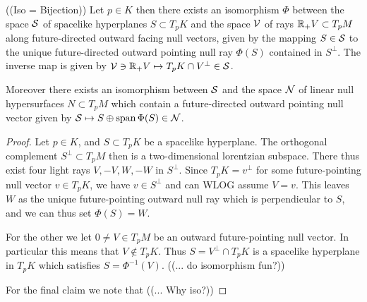 \begin{lemma}\label{lem:dirreconstr}
    ((Iso = Bijection))
Let $p\in K$ then there exists an isomorphism $\Phi$ between the space $\mathcal{S}$ of spacelike hyperplanes $S\subset T_pK$ and the space $\mathcal{V}$ of rays $\mathbb{R}_+V\subset T_pM$ along future-directed outward facing null vectors, given by the mapping $S\in \mathcal{S}$ to the unique future-directed outward pointing null ray $\Phi(S)$ contained in $S^\perp$. The inverse map is given by $\mathcal{V}\ni \mathbb{R}_+V \mapsto T_pK \cap V^\perp\in \mathcal{S}$.

Moreover there exists an isomorphism between $\mathcal{S}$ and the space $\mathcal{N}$ of linear null hypersurfaces $N\subset T_pM$ which contain a future-directed outward pointing null vector given by $\mathcal{S}\mapsto S\oplus \operatorname{span} \Phi(S)\in \mathcal{N}$.
\end{lemma}
\begin{proof}
    Let $p\in K$, and $S\subset T_pK$ be a spacelike hyperplane. The orthogonal complement $S^\perp\subset T_pM$ then is a two-dimensional lorentzian subspace. There thus exist four light rays $V,-V,W,-W$ in $S^\perp$. Since $T_pK=v^\perp$ for some future-pointing null vector $v\in T_pK$, we have $v\in S^\perp$ and can WLOG assume $V=v$. This leaves $W$ as the unique future-pointing outward null ray which is perpendicular to $S$, and we can thus set $\Phi(S)=W$.

    For the other we let $0\neq V\in T_pM$ be an outward future-pointing null vector. In particular this means that $V\notin T_pK$. Thus $S=V^\perp\cap T_pK$ is a spacelike hyperplane in $T_pK$ which satisfies $S=\Phi^{-1}(V)$. ((... do isomorphism fun?))

    For the final claim we note that ((... Why iso?))
\end{proof}

